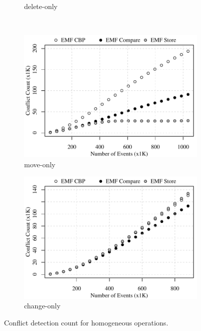 \begin{figure}[ht]
\begin{subfigure}[t]{0.490\linewidth}
    \caption{delete-only}
    \label{fig:delete-conflict-count-events}
  \end{subfigure}
  \\
  \begin{subfigure}[t]{0.490\linewidth}
    \includegraphics[width=\linewidth]{move-conflict-count-events}
    \caption{move-only}
    \label{fig:move-conflict-count-events}
  \end{subfigure}
  \hfill
  \begin{subfigure}[t]{0.490\linewidth}
    \includegraphics[width=\linewidth]{change-conflict-count-events}
    \caption{change-only}
    \label{fig:change-conflict-count-events}
  \end{subfigure}
  \caption{Conflict detection count for homogeneous operations.}
  \label{fig:homgeneous_operation_count_events}
\end{figure}


